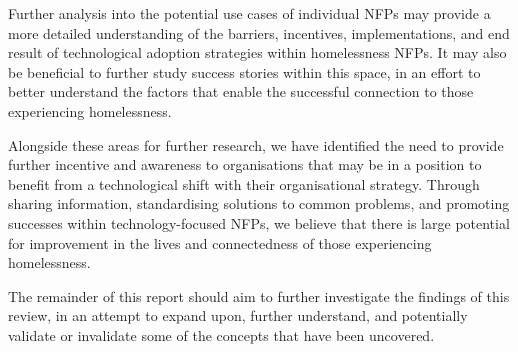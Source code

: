 Further analysis into the potential use cases of individual NFPs may provide a more detailed understanding of the barriers, incentives, implementations, and end result of technological adoption strategies within homelessness NFPs. It may also be beneficial to further study success stories within this space, in an effort to better understand the factors that enable the successful connection to those experiencing homelessness.

Alongside these areas for further research, we have identified the need to provide further incentive and awareness to organisations that may be in a position to benefit from a technological shift with their organisational strategy. Through sharing information, standardising solutions to common problems, and promoting successes within technology-focused NFPs, we believe that there is large potential for improvement in the lives and connectedness of those experiencing homelessness.

The remainder of this report should aim to further investigate the findings of this review, in an attempt to expand upon, further understand, and potentially validate or invalidate some of the concepts that have been uncovered.